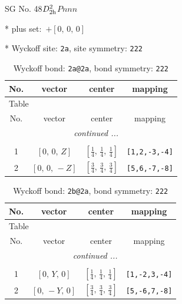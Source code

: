 \documentclass[fleqn,8pt]{jsarticle}
\begin{document}
\setcounter{MaxMatrixCols}{32}

\renewcommand{\tablename}{Table~}
\renewcommand{\figurename}{Figure~}
\begin{center}
\LARGE
SG No. 48\quad$D_{\rm 2h}^{2}$\quad$Pnnn$\quad[ orthorhombic ]
\end{center}

* plus set:\,\,\,$+\left[ 0,\, 0,\, 0 \right]$


* Wyckoff site: {\tt 2a}, site symmetry: {\tt 222}
\renewcommand{\arraystretch}{1.2}
\begin{longtable}{cccc}
\caption{Wyckoff bond: {\tt 2a@2a}, bond symmetry: {\tt 222}}
 \\
 \hline \hline
No. & vector & center & mapping \\ \hline \endfirsthead

\multicolumn{3}{l}{\tablename\ \thetable{}} \\
 \hline \hline
No. & vector & center & mapping \\ \hline \endhead

 \hline \hline
\multicolumn{3}{r}{\footnotesize\it continued ...} \\ \endfoot

 \hline \hline
\multicolumn{3}{r}{} \\ \endlastfoot

1 & $\left[ 0,\, 0,\, Z \right]$ & $\left[ \frac{1}{4},\, \frac{1}{4},\, \frac{1}{4} \right]$ & {\tt [1,2,-3,-4]} \\ \hline
2 & $\left[ 0,\, 0,\, - Z \right]$ & $\left[ \frac{3}{4},\, \frac{3}{4},\, \frac{3}{4} \right]$ & {\tt [5,6,-7,-8]} \\
\end{longtable}
\renewcommand{\arraystretch}{1.2}
\begin{longtable}{cccc}
\caption{Wyckoff bond: {\tt 2b@2a}, bond symmetry: {\tt 222}}
 \\
 \hline \hline
No. & vector & center & mapping \\ \hline \endfirsthead

\multicolumn{3}{l}{\tablename\ \thetable{}} \\
 \hline \hline
No. & vector & center & mapping \\ \hline \endhead

 \hline \hline
\multicolumn{3}{r}{\footnotesize\it continued ...} \\ \endfoot

 \hline \hline
\multicolumn{3}{r}{} \\ \endlastfoot

1 & $\left[ 0,\, Y,\, 0 \right]$ & $\left[ \frac{1}{4},\, \frac{1}{4},\, \frac{1}{4} \right]$ & {\tt [1,-2,3,-4]} \\ \hline
2 & $\left[ 0,\, - Y,\, 0 \right]$ & $\left[ \frac{3}{4},\, \frac{3}{4},\, \frac{3}{4} \right]$ & {\tt [5,-6,7,-8]} \\
\end{longtable}
\end{document}

